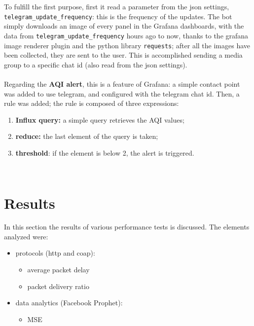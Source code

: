 \documentclass[]{article}
\begin{document}
To fulfill the first purpose, first it read a parameter from the json settings, \texttt{telegram\_update\_frequency}: this is the frequency of the updates. The bot simply downloads an image of every panel in the Grafana dashboards, with the data from \texttt{telegram\_update\_frequency} hours ago to now, thanks to the grafana image renderer plugin and the python library \texttt{requests}; after all the images have been collected, they are sent to the user. This is accomplished sending a media group to a specific chat id (also read from the json settings).
\\
\\
Regarding the \textbf{AQI alert}, this is a feature of Grafana: a simple contact point was added to use telegram, and configured with the telegram chat id. Then, a rule was added; the rule is composed of three expressions:
\begin{enumerate}
	\item \textbf{Influx query:} a simple query retrieves the AQI values;
	\item \textbf{reduce:} the last element of the query is taken;
	\item \textbf{threshold}: if the element is below 2, the alert is triggered.
\end{enumerate}



\begin{lstlisting}
	
\end{lstlisting}

\section{Results}

In this section the results of various performance tests is discussed. The elements analyzed were:
\begin{itemize}
	\item protocols (http and coap):
	\begin{itemize}
		\item average packet delay
		\item packet delivery ratio
	\end{itemize}
	\item data analytics (Facebook Prophet):
	\begin{itemize}
		\item MSE
	\end{itemize}
\end{itemize}
\end{document}
